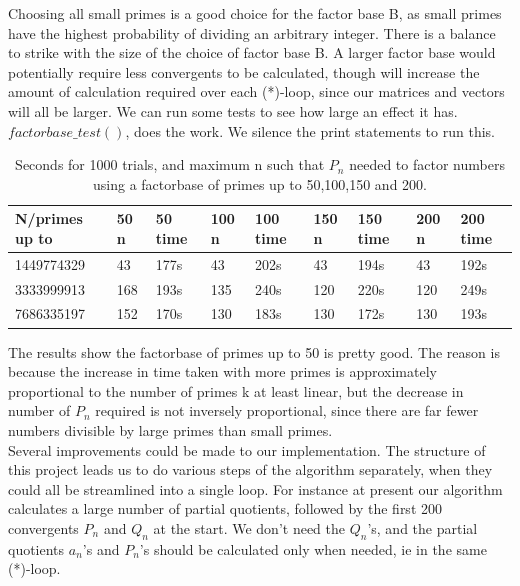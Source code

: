 \documentclass[10pt,a4paper]{report}
\begin{document}
Choosing all small primes is a good choice for the factor base B, as small primes have the highest probability of dividing an arbitrary integer. There is a balance to strike with the size of the choice of factor base B. A larger factor base would potentially require less convergents to be calculated, though will increase the amount of calculation required over each (*)-loop, since our matrices and vectors will all be larger. We can run some tests to see how large an effect it has. $factorbase\_test()$, does the work. We silence the print statements to run this.\\

\begin{table}[h]
\centering
\begin{tabular}{|l|l|l|l|l|l|l|l|l|}
\hline
N/primes up to & 50 n & 50 time & 100 n & 100 time & 150 n & 150 time & 200 n & 200 time \\ \hline
1449774329     & 43   & 177s    & 43    & 202s     & 43    & 194s     & 43    & 192s     \\ \hline
3333999913     & 168  & 193s    & 135   & 240s     & 120   & 220s     & 120   & 249s     \\ \hline
7686335197     & 152  & 170s    & 130   & 183s     & 130   & 172s     & 130   & 193s     \\ \hline
\end{tabular}
\caption{Seconds for 1000 trials, and maximum n such that $P_n$ needed to factor numbers using a factorbase of primes up to 50,100,150 and 200.}
\end{table}


The results show the factorbase of primes up to 50 is pretty good. The reason is because the increase in time taken with more primes is approximately proportional to the number of primes k at least linear, but the decrease in number of $P_n$ required is not inversely proportional, since there are far fewer numbers divisible by large primes than small primes.\\


Several improvements could be made to our implementation. The structure of this project leads us to do various steps of the algorithm separately, when they could all be streamlined into a single loop. For instance at present our algorithm calculates a large number of partial quotients, followed by the first 200 convergents $P_n$ and $Q_n$ at the start. We don't need the $Q_n$'s, and the partial quotients $a_n$'s and $P_n$'s should be calculated only when needed, ie in the same (*)-loop. \\
\end{document}
